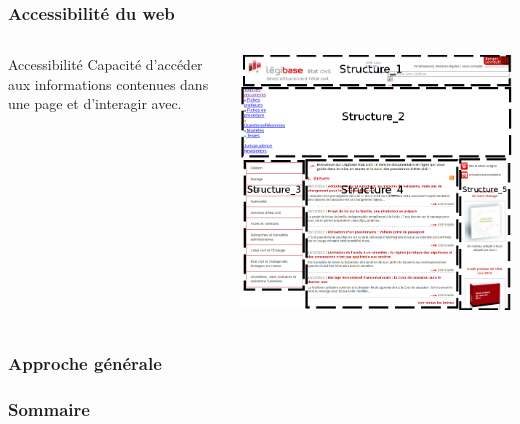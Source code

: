 \documentclass[]{beamer}
\begin{document}
\begin{frame}
\frametitle{Accessibilité du web}
\begin{columns}
	\begin{column}{4cm}
	\begin{definition}{Accessibilité}
	Capacité d'accéder aux informations contenues dans une page et d'interagir avec.
	\end{definition}
	\end{column}
	\begin{column}{4cm}
	\includegraphics[scale=0.2]{img/segmentation_page_berger.png}
	\end{column}
\end{columns}
\end{frame}


\begin{frame}
	\frametitle{Approche générale}
\end{frame}

\begin{frame}
  \frametitle{Sommaire}
  \tableofcontents
\end{frame}
\end{document}
